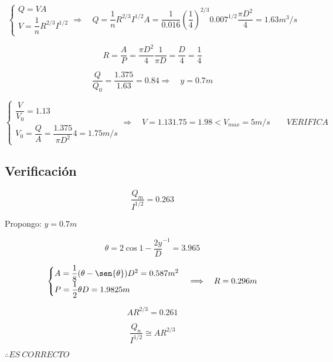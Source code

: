 \documentclass[10.5pt]{article}
\begin{document}
\begin{equation*}
  \begin{cases}
    Q = V A \\
    V = \dfrac{1}{n} R^{2/3} I^{1/2}
  \end{cases}
  \Longrightarrow \quad
  Q = \dfrac{1}{n} R^{2/3} I^{1/2} A = \dfrac{1}{0.016} (\dfrac{1}{4})^{2/3} 0.007^{1/2} \dfrac{\pi D^{2}}{4} = 1.63 m^{3}/s
\end{equation*}

\begin{equation*}
  R = \dfrac{A}{P} = \dfrac{\pi D^{2}}{4} \dfrac{1}{\pi D} = \dfrac{D}{4} = \dfrac{1}{4}
\end{equation*}

\begin{equation*}
  \dfrac{Q}{Q_{0}} = \dfrac{1.375}{1.63} = 0.84
  \Longrightarrow \quad
  y = 0.7 m
\end{equation*}

\begin{equation*}
  \begin{cases}
    \dfrac{V}{V_{0}} = 1.13 \\
    V_{0} = \dfrac{Q}{A} = \dfrac{1.375}{\pi D^{2}} 4 = 1.75 m/s
  \end{cases}
  \Longrightarrow \quad
  V = 1.13 1.75 = 1.98 < V_{max} = 5 m/s
  \qquad
  VERIFICA
\end{equation*}



\subsection*{Verificación}

\begin{equation*}
  \dfrac{Q_{m}}{I^{1/2}} = 0.263
\end{equation*}

Propongo: $y = 0.7 m$

\begin{equation*}
  \theta = 2 \cos{1 - \dfrac{2 y}{D}}^{-1} = 3.965
\end{equation*}

\begin{equation*}
  \begin{cases}
    A = \dfrac{1}{8} (\theta - \sen{\theta}) D^{2} = 0.587 m^{2} \\
    P = \dfrac{1}{2} \theta D = 1.9825 m
  \end{cases}
  \Longrightarrow \quad
  R = 0.296 m
\end{equation*}

\begin{equation*}
  A R^{2/3} = 0.261
\end{equation*}

\begin{equation*}
  \dfrac{Q_{n}}{I^{1/2}} \cong A R^{2/3}
\end{equation*}

$\therefore ES\ CORRECTO$
\end{document}
